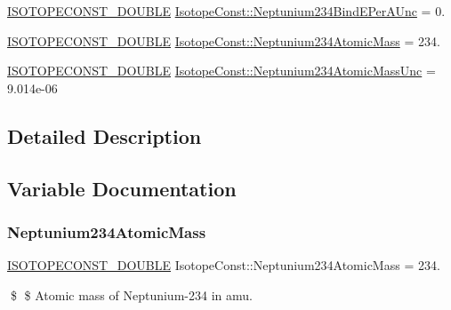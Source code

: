 \begin{DoxyCompactItemize}
\mbox{\hyperlink{group___isotope_const-_macros_ga8f45a7272ce02c0b4c65c44636ed719a}{I\+S\+O\+T\+O\+P\+E\+C\+O\+N\+S\+T\+\_\+\+D\+O\+U\+B\+LE}} \mbox{\hyperlink{group___isotope_const-_neptunium-_np234_ga559be452af24a61f5ea6a5af686e0b0c}{Isotope\+Const\+::\+Neptunium234\+Bind\+E\+Per\+A\+Unc}} = 0.
\item 
\mbox{\hyperlink{group___isotope_const-_macros_ga8f45a7272ce02c0b4c65c44636ed719a}{I\+S\+O\+T\+O\+P\+E\+C\+O\+N\+S\+T\+\_\+\+D\+O\+U\+B\+LE}} \mbox{\hyperlink{group___isotope_const-_neptunium-_np234_ga57c539bfd270a3babce23e9215611d79}{Isotope\+Const\+::\+Neptunium234\+Atomic\+Mass}} = 234.
\item 
\mbox{\hyperlink{group___isotope_const-_macros_ga8f45a7272ce02c0b4c65c44636ed719a}{I\+S\+O\+T\+O\+P\+E\+C\+O\+N\+S\+T\+\_\+\+D\+O\+U\+B\+LE}} \mbox{\hyperlink{group___isotope_const-_neptunium-_np234_gab3ce164a9b19a23a8cb476b5a528a27a}{Isotope\+Const\+::\+Neptunium234\+Atomic\+Mass\+Unc}} = 9.\+014e-\/06
\end{DoxyCompactItemize}


\subsection{Detailed Description}


\subsection{Variable Documentation}
\mbox{\label{group___isotope_const-_neptunium-_np234_ga57c539bfd270a3babce23e9215611d79}} 
\subsubsection{\texorpdfstring{Neptunium234\+Atomic\+Mass}{Neptunium234AtomicMass}}
{\footnotesize\ttfamily \mbox{\hyperlink{group___isotope_const-_macros_ga8f45a7272ce02c0b4c65c44636ed719a}{I\+S\+O\+T\+O\+P\+E\+C\+O\+N\+S\+T\+\_\+\+D\+O\+U\+B\+LE}} Isotope\+Const\+::\+Neptunium234\+Atomic\+Mass = 234.}

\$ \$ Atomic mass of Neptunium-\/234 in amu. \mbox{\label{group___isotope_const-_neptunium-_np234_gab3ce164a9b19a23a8cb476b5a528a27a}} 
